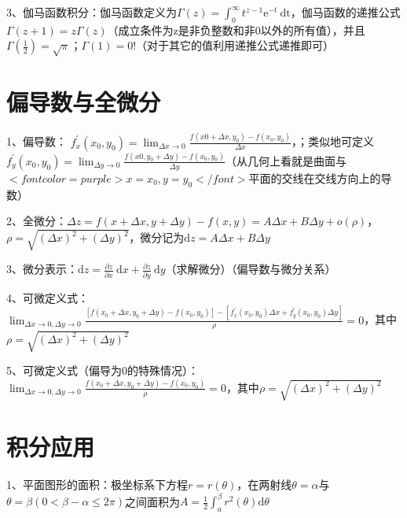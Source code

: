 3、伽马函数积分：伽马函数定义为$ \Gamma(z)=\int_{0}^{\infty} t^{z-1} \mathrm{e}^{-t} \mathrm{~d} \mathrm{t} $，伽马函数的递推公式$ \Gamma(z+1)=z \Gamma(z) $（成立条件为z是非负整数和非0以外的所有值），并且$ \Gamma\left(\frac{1}{2}\right) =\sqrt{\pi} $；$ \Gamma(1) =0 ! $（对于其它的值利用递推公式递推即可）

\section{偏导数与全微分}

1、偏导数： $ f_{x}^{\prime}\left(x_{0}, y_{0}\right)=\lim_{\Delta x \rightarrow 0} \frac{f\left(x{0}+\Delta x, y_{0}\right)-f\left(x_{0}, y_{0}\right)}{\Delta x} $，；类似地可定义$ f_{y}^{\prime}\left(x_{0}, y_{0}\right)=\lim_{\Delta y \rightarrow 0} \frac{f\left(x{0}, y_{0}+\Delta y\right)-f\left(x_{0}, y_{0}\right)}{\Delta y} $（从几何上看就是曲面与$ <font color=purple>x=x_0,y=y_0</font> $平面的交线在交线方向上的导数）

2、全微分：$ \Delta z=f(x+\Delta x, y+\Delta y)-f(x, y)=A \Delta x+B \Delta y+o(\rho) $，$ \rho=\sqrt{(\Delta x)^{2}+(\Delta y)^{2}} $，微分记为$ \mathrm{d} z=A \Delta x+B \Delta y $

3、微分表示：$ \mathrm{d} z=\frac{\partial z}{\partial x} \mathrm{~d} x+\frac{\partial z}{\partial y} \mathrm{~d} y $（求解微分）（偏导数与微分关系）

4、可微定义式：$ \lim_{\Delta x \rightarrow 0,\Delta y \rightarrow 0}\frac{\left[f\left(x_{0}+\Delta x, y_{0}+\Delta y\right)-f\left(x_{0}, y_{0}\right)\right]-\left[f_{x}^{\prime}\left(x_{0}, y_{0}\right) \Delta x+f_{y}^{\prime}\left(x_{0}, y_{0}\right) \Delta y\right]}{\rho}=0 $，其中$ \rho=\sqrt{(\Delta x)^{2}+(\Delta y)^{2}} $

5、可微定义式（偏导为0的特殊情况）：$ \lim_{\Delta x \rightarrow 0,\Delta y \rightarrow 0}\frac{f\left(x_{0}+\Delta x, y_{0}+\Delta y\right)-f\left(x_{0}, y_{0}\right)}{\rho}=0 $，其中$ \rho=\sqrt{(\Delta x)^{2}+(\Delta y)^{2}} $

\section{积分应用}

1、平面图形的面积：极坐标系下方程$ r=r(\theta) $，在两射线$ \theta=\alpha $与$ \theta=\beta(0<\beta-\alpha \leqslant 2 \pi) $之间面积为$ A=\frac{1}{2} \int_{a}^{\beta} r^{2}(\theta) \mathrm{d} \theta $

